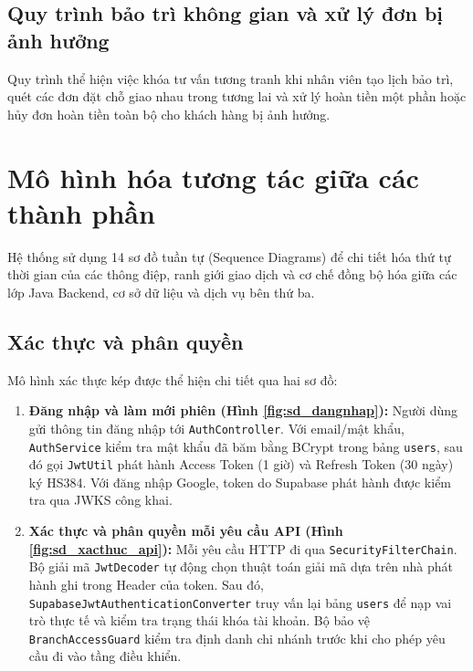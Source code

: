 
\subsection{Quy trình bảo trì không gian và xử lý đơn bị ảnh hưởng}
Quy trình thể hiện việc khóa tư vấn tương tranh khi nhân viên tạo lịch bảo trì, quét các đơn đặt chỗ giao nhau trong tương lai và xử lý hoàn tiền một phần hoặc hủy đơn hoàn tiền toàn bộ cho khách hàng bị ảnh hưởng.


\clearpage
\section{Mô hình hóa tương tác giữa các thành phần}
\label{sec:sequence}

Hệ thống sử dụng 14 sơ đồ tuần tự (Sequence Diagrams) để chi tiết hóa thứ tự thời gian của các thông điệp, ranh giới giao dịch và cơ chế đồng bộ hóa giữa các lớp Java Backend, cơ sở dữ liệu và dịch vụ bên thứ ba.

\subsection{Xác thực và phân quyền}
\label{ssec:seq_xacthuc}
Mô hình xác thực kép được thể hiện chi tiết qua hai sơ đồ:
\begin{enumerate}
    \item \textbf{Đăng nhập và làm mới phiên (Hình \ref{fig:sd_dangnhap}):} Người dùng gửi thông tin đăng nhập tới \texttt{AuthController}. Với email/mật khẩu, \texttt{AuthService} kiểm tra mật khẩu đã băm bằng BCrypt trong bảng \texttt{users}, sau đó gọi \texttt{JwtUtil} phát hành Access Token (1 giờ) và Refresh Token (30 ngày) ký HS384. Với đăng nhập Google, token do Supabase phát hành được kiểm tra qua JWKS công khai.
    \item \textbf{Xác thực và phân quyền mỗi yêu cầu API (Hình \ref{fig:sd_xacthuc_api}):} Mỗi yêu cầu HTTP đi qua \texttt{SecurityFilterChain}. Bộ giải mã \texttt{JwtDecoder} tự động chọn thuật toán giải mã dựa trên nhà phát hành ghi trong Header của token. Sau đó, \texttt{SupabaseJwtAuthenticationConverter} truy vấn lại bảng \texttt{users} để nạp vai trò thực tế và kiểm tra trạng thái khóa tài khoản. Bộ bảo vệ \texttt{BranchAccessGuard} kiểm tra định danh chi nhánh trước khi cho phép yêu cầu đi vào tầng điều khiển.
\end{enumerate}

